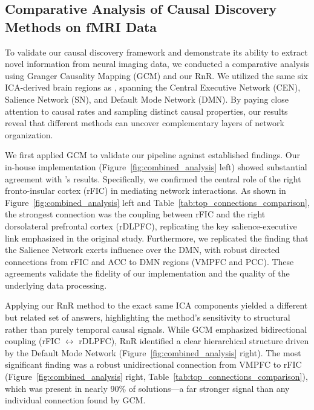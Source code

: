 \subsection{Comparative Analysis of Causal Discovery Methods on fMRI Data}

To validate our causal discovery framework and demonstrate its ability to extract novel information from neural imaging data, we conducted a comparative analysis using Granger Causality Mapping (GCM) \cite{roebroeck2005mapping} and our RnR. We utilized the same six ICA-derived brain regions as \cite{sridharan2008critical}, spanning the Central Executive Network (CEN), Salience Network (SN), and Default Mode Network (DMN). By paying close attention to causal rates and sampling distinct causal properties, our results reveal that different methods can uncover complementary layers of network organization.


We first applied GCM to validate our pipeline against established findings. Our in-house implementation (Figure~\ref{fig:combined_analysis} left) showed substantial agreement with \cite{sridharan2008critical}'s results. Specifically, we confirmed the central role of the right fronto-insular cortex (rFIC) in mediating network interactions. As shown in Figure~\ref{fig:combined_analysis} left and Table~\ref{tab:top_connections_comparison}, the strongest connection was the coupling between rFIC and the right dorsolateral prefrontal cortex (rDLPFC), replicating the key salience-executive link emphasized in the original study. Furthermore, we replicated the finding that the Salience Network exerts influence over the DMN, with robust directed connections from rFIC and ACC to DMN regions (VMPFC and PCC). These agreements validate the fidelity of our implementation and the quality of the underlying data processing.


Applying our RnR method to the exact same ICA components yielded a different but related set of answers, highlighting the method's sensitivity to structural rather than purely temporal causal signals. While GCM emphasized bidirectional coupling (rFIC $\leftrightarrow$ rDLPFC), RnR identified a clear hierarchical structure driven by the Default Mode Network (Figure~\ref{fig:combined_analysis} right). The most significant finding was a robust unidirectional connection from VMPFC to rFIC (Figure~\ref{fig:combined_analysis} right, Table~\ref{tab:top_connections_comparison}), which was present in nearly 90\% of solutions—a far stronger signal than any individual connection found by GCM.

